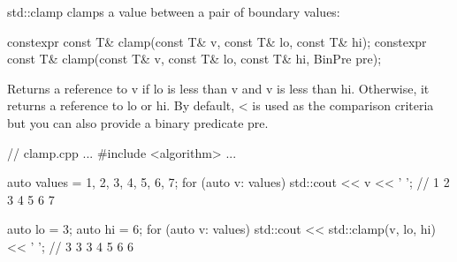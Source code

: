 std::clamp clamps a value between a pair of boundary values:

\begin{cpp}
constexpr const T& clamp(const T& v, const T& lo, const T& hi);
constexpr const T& clamp(const T& v, const T& lo, const T& hi, BinPre pre);
\end{cpp}

Returns a reference to v if lo is less than v and v is less than hi. Otherwise, it returns a reference to lo or hi. By default, < is used as the comparison criteria but you can also provide a binary predicate pre.


\begin{cpp}
// clamp.cpp
...
#include <algorithm>
...

auto values = {1, 2, 3, 4, 5, 6, 7};
for (auto v: values) std::cout << v << ' '; // 1 2 3 4 5 6 7

auto lo = 3;
auto hi = 6;
for (auto v: values) std::cout << std::clamp(v, lo, hi) << ' '; // 3 3 3 4 5 6 6
\end{cpp}





















